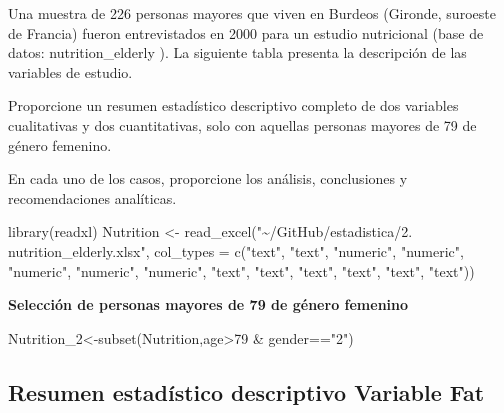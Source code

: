 \documentclass[
]{article}
\newenvironment{Shaded}{\begin{snugshade}}{\end{snugshade}}
\newcommand{\AttributeTok}[1]{\textcolor[rgb]{0.77,0.63,0.00}{#1}}
\newcommand{\DecValTok}[1]{\textcolor[rgb]{0.00,0.00,0.81}{#1}}
\newcommand{\FunctionTok}[1]{\textcolor[rgb]{0.00,0.00,0.00}{#1}}
\newcommand{\NormalTok}[1]{#1}
\newcommand{\OtherTok}[1]{\textcolor[rgb]{0.56,0.35,0.01}{#1}}
\newcommand{\SpecialCharTok}[1]{\textcolor[rgb]{0.00,0.00,0.00}{#1}}
\newcommand{\StringTok}[1]{\textcolor[rgb]{0.31,0.60,0.02}{#1}}
\begin{document}
Una muestra de 226 personas mayores que viven en Burdeos (Gironde,
suroeste de Francia) fueron entrevistados en 2000 para un estudio
nutricional (base de datos: nutrition\_elderly ). La siguiente tabla
presenta la descripción de las variables de estudio.

Proporcione un resumen estadístico descriptivo completo de dos variables
cualitativas y dos cuantitativas, solo con aquellas personas mayores de
79 de género femenino.

En cada uno de los casos, proporcione los análisis, conclusiones y
recomendaciones analíticas.

\begin{Shaded}
\begin{Highlighting}[]
\FunctionTok{library}\NormalTok{(readxl)}
\NormalTok{Nutrition }\OtherTok{\textless{}{-}} \FunctionTok{read\_excel}\NormalTok{(}\StringTok{"\textasciitilde{}/GitHub/estadistica/2. nutrition\_elderly.xlsx"}\NormalTok{, }
    \AttributeTok{col\_types =} \FunctionTok{c}\NormalTok{(}\StringTok{"text"}\NormalTok{, }\StringTok{"text"}\NormalTok{, }\StringTok{"numeric"}\NormalTok{, }
        \StringTok{"numeric"}\NormalTok{, }\StringTok{"numeric"}\NormalTok{, }\StringTok{"numeric"}\NormalTok{, }
        \StringTok{"numeric"}\NormalTok{, }\StringTok{"text"}\NormalTok{, }\StringTok{"text"}\NormalTok{, }\StringTok{"text"}\NormalTok{, }
        \StringTok{"text"}\NormalTok{, }\StringTok{"text"}\NormalTok{, }\StringTok{"text"}\NormalTok{))}
\end{Highlighting}
\end{Shaded}

\textbf{Selección de personas mayores de 79 de género femenino}

\begin{Shaded}
\begin{Highlighting}[]
\NormalTok{Nutrition\_2}\OtherTok{\textless{}{-}}\FunctionTok{subset}\NormalTok{(Nutrition,age}\SpecialCharTok{\textgreater{}}\DecValTok{79} \SpecialCharTok{\&}\NormalTok{ gender}\SpecialCharTok{==}\StringTok{"2"}\NormalTok{)}
\end{Highlighting}
\end{Shaded}

\hypertarget{resumen-estaduxedstico-descriptivo-variable-fat}{%
\subsection{\texorpdfstring{Resumen estadístico descriptivo Variable
\textbf{Fat}}{Resumen estadístico descriptivo Variable Fat}}\label{resumen-estaduxedstico-descriptivo-variable-fat}}
\end{document}
